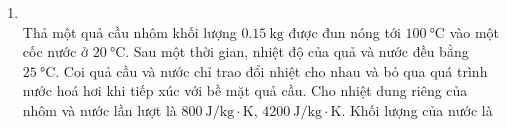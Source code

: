 \begin{enumerate}[label=\bfseries Câu \arabic*:, leftmargin=1.7cm]
\item {}\\
Thả một quả cầu nhôm khối lượng $\SI{0.15}{\kilogram}$ được đun nóng tới $\SI{100}{\celsius}$ vào một cốc nước ở $\SI{20}{\celsius}$. Sau một thời gian, nhiệt độ của quả và nước đều bằng $\SI{25}{\celsius}$. Coi quả cầu và nước chỉ trao đổi nhiệt cho nhau và bỏ qua quá trình nước hoá hơi khi tiếp xúc với bề mặt quả cầu. Cho nhiệt dung riêng của nhôm và nước lần lượt là $\SI{800}{\joule/\kilogram\cdot\kelvin}$, $\SI{4200}{\joule/\kilogram\cdot\kelvin}$. Khối lượng của nước là 
\end{enumerate}
